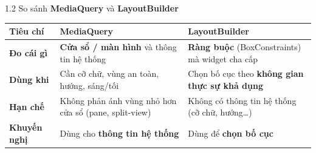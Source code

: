 \documentclass[aspectratio=169,10pt]{beamer}
\begin{document}
\begin{frame}{1.2 So sánh \textbf{MediaQuery} và \textbf{LayoutBuilder}}
  \footnotesize
  \renewcommand{\arraystretch}{1.5}
  \centering
  \begin{tabular}{@{}>{\raggedright\arraybackslash}p{2.2cm}>{\raggedright\arraybackslash}p{5.2cm}>{\raggedright\arraybackslash}p{5.2cm}@{}}
    \hline
    \rowcolor{cHead}\textbf{Tiêu chí} & \textbf{MediaQuery} & \textbf{LayoutBuilder}\\ \hline
    \textbf{Đo cái gì} & \textbf{Cửa sổ / màn hình} và thông tin hệ thống & \textbf{Ràng buộc} (BoxConstraints) mà widget cha cấp\\ \hline
    \textbf{Dùng khi} & Cần cỡ chữ, vùng an toàn, hướng, sáng/tối & Chọn bố cục theo \textbf{không gian thực sự khả dụng}\\ \hline
    \textbf{Hạn chế} & Không phản ánh vùng nhỏ hơn cửa sổ (pane, split-view) & Không có thông tin hệ thống (cỡ chữ, hướng\ldots)\\ \hline
    \textbf{Khuyến nghị} & Dùng cho \textbf{thông tin hệ thống} & Dùng để \textbf{chọn bố cục}\\ \hline
  \end{tabular}
\end{frame}
\end{document}
